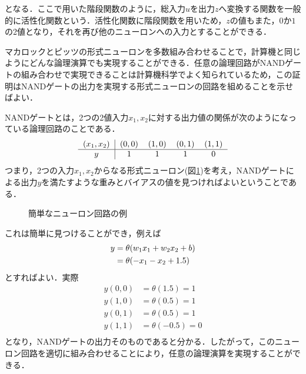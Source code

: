 \documentclass[a4paper,11pt]{jsreport}
\begin{document}
となる．ここで用いた階段関数のように，総入力$u$を出力$z$へ変換する関数を一般的に活性化関数という．活性化関数に階段関数を用いため，$z$の値もまた，$0$か$1$の2値となり，それを再び他のニューロンへの入力とすることができる．\par
マカロックとピッツの形式ニューロンを多数組み合わせることで，計算機と同じようにどんな論理演算でも実現することができる．任意の論理回路がNANDゲートの組み合わせで実現できることは計算機科学でよく知られているため，この証明はNANDゲートの出力を実現する形式ニューロンの回路を組めることを示せばよい．\par
NANDゲートとは，2つの2値入力$x_1, x_2$に対する出力値の関係が次のようになっている論理回路のことである．
\begin{equation*}
  \begin{tabular}{c|cccc}
    $(x_1, x_2)$ & $(0,0)$ & $(1,0)$ & $(0,1)$ & $(1,1)$ \\ \hline
    $y$          & $1$     & $1$     & $1$     & $0$     \\
  \end{tabular}
\end{equation*}
つまり，2つの入力$x_1, x_2$からなる形式ニューロン(図\ref{ニューロン回路の例})を考え，NANDゲートによる出力$y$を満たすような重みとバイアスの値を見つければよいということである．\par
\begin{figure}[H]
  \centering
    \caption{簡単なニューロン回路の例}
    \label{ニューロン回路の例}
\end{figure}
これは簡単に見つけることができ，例えば
\begin{align}
  y
  &= \theta(w_1 x_1 + w_2 x_2 + b) \notag \\
  &= \theta(-x_1 - x_2 + 1.5)
\end{align}
とすればよい．実際
\begin{align*}
  y(0,0) & = \theta(1.5) = 1  \\
  y(1,0) & = \theta(0.5) = 1  \\
  y(0,1) & = \theta(0.5) = 1  \\
  y(1,1) & = \theta(-0.5) = 0 \\
\end{align*}
となり，NANDゲートの出力そのものであると分かる．したがって，このニューロン回路を適切に組み合わせることにより，任意の論理演算を実現することができる．
\end{document}
